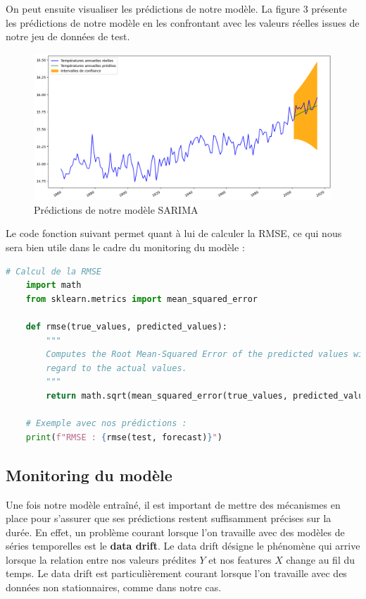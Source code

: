 \documentclass[french]{article}
\begin{document}
    On peut ensuite visualiser les prédictions de notre modèle. La figure 3 présente les prédictions de notre modèle en les confrontant avec les valeurs réelles issues de notre jeu de données de test.

    \begin{figure}[h]
        \includegraphics[width=12cm]{forecast}
        \centering
        \caption{Prédictions de notre modèle SARIMA}
        \centering
    \end{figure}

    Le code fonction suivant permet quant à lui de calculer la RMSE, ce qui nous sera bien utile dans le cadre du monitoring du modèle :
    \begin{lstlisting}[language=Python]
    # Calcul de la RMSE
    import math
    from sklearn.metrics import mean_squared_error
    
    def rmse(true_values, predicted_values):
        """
        Computes the Root Mean-Squared Error of the predicted values with 
        regard to the actual values.
        """
        return math.sqrt(mean_squared_error(true_values, predicted_values))
    
    # Exemple avec nos prédictions :
    print(f"RMSE : {rmse(test, forecast)}")
    \end{lstlisting}

    \subsection{Monitoring du modèle}
    
    Une fois notre modèle entraîné, il est important de mettre des mécanismes en place pour s'assurer que ses prédictions restent suffisamment précises sur la durée. En effet, un problème courant lorsque l'on travaille avec des modèles de séries temporelles est le \textbf{data drift}. Le data drift désigne le phénomène qui arrive lorsque la relation entre nos valeurs prédites $Y$ et nos features $X$ change au fil du temps. Le data drift est particulièrement courant lorsque l'on travaille avec des données non stationnaires, comme dans notre cas.
    
\end{document}

